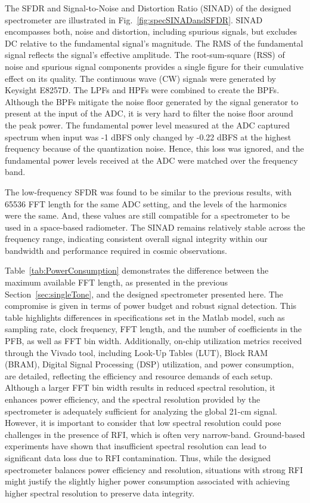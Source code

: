 \documentclass[fleqn,usenatbib]{rasti}
\begin{document}
The SFDR and Signal-to-Noise and Distortion Ratio (SINAD) of the designed spectrometer are illustrated in Fig.~\ref{fig:specSINADandSFDR}. SINAD encompasses both, noise and distortion, including spurious signals, but excludes DC relative to the fundamental signal's magnitude. The RMS of the fundamental signal reflects the signal's effective amplitude. The root-sum-square (RSS) of noise and spurious signal components provides a single figure for their cumulative effect on its quality. The continuous wave (CW) signals were generated by Keysight E8257D. The LPFs and HPFs were combined to create the BPFs. Although the BPFs mitigate the noise floor generated by the signal generator to present at the input of the ADC, it is very hard to filter the noise floor around the peak power. The fundamental power level measured at the ADC captured spectrum when input was -1 dBFS only changed by -0.22 dBFS at the highest frequency because of the quantization noise. Hence, this loss was ignored, and the fundamental power levels received at the ADC were matched over the frequency band.

The low-frequency SFDR was found to be similar to the previous results, with 65536 FFT length for the same ADC setting, and the levels of the harmonics were the same. And, these values are still compatible for a spectrometer to be used in a space-based radiometer. The SINAD remains relatively stable across the frequency range, indicating consistent overall signal integrity within our bandwidth and performance required in cosmic observations.

Table~\ref{tab:PowerConsumption} demonstrates the difference between the maximum available FFT length, as presented in the previous Section~\ref{sec:singleTone}, and the designed spectrometer presented here. The compromise is given in terms of power budget and robust signal detection. This table highlights differences in specifications set in the Matlab model, such as sampling rate, clock frequency, FFT length, and the number of coefficients in the PFB, as well as FFT bin width. Additionally, on-chip utilization metrics received through the Vivado tool, including Look-Up Tables (LUT), Block RAM (BRAM), Digital Signal Processing (DSP) utilization, and power consumption, are detailed, reflecting the efficiency and resource demands of each setup. Although a larger FFT bin width results in reduced spectral resolution, it enhances power efficiency, and the spectral resolution provided by the spectrometer is adequately sufficient for analyzing the global 21-cm signal. However, it is important to consider that low spectral resolution could pose challenges in the presence of RFI, which is often very narrow-band. Ground-based experiments have shown that insufficient spectral resolution can lead to significant data loss due to RFI contamination. Thus, while the designed spectrometer balances power efficiency and resolution, situations with strong RFI might justify the slightly higher power consumption associated with achieving higher spectral resolution to preserve data integrity.
\end{document}
